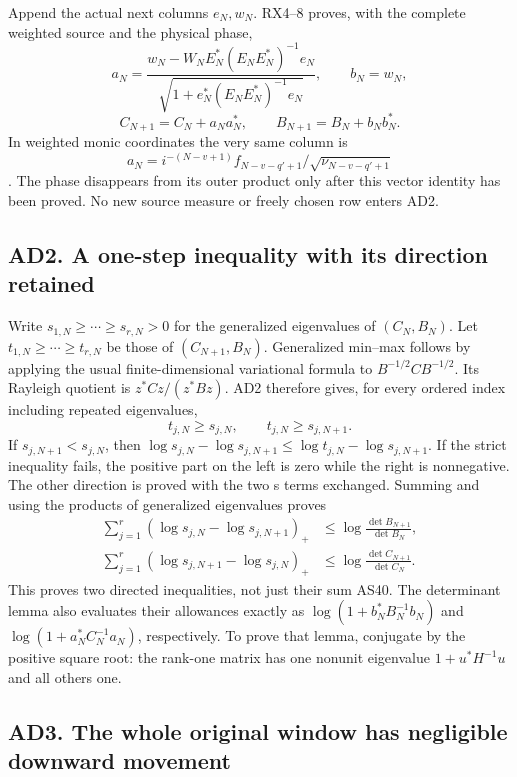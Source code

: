 \documentclass[11pt]{article}
\begin{document}
Append the actual next columns \(e_N,w_N\). RX4--8 proves, with the complete weighted source and the physical phase, \[
a_N=\frac{w_N-W_NE_N^*(E_NE_N^*)^{-1}e_N}
{\sqrt{1+e_N^*(E_NE_N^*)^{-1}e_N}},
\qquad b_N=w_N,
\] \[
C_{N+1}=C_N+a_Na_N^*,\qquad
B_{N+1}=B_N+b_Nb_N^*.
\tag{AD2}
\] In weighted monic coordinates the very same column is \[a_N=i^{-(N-v+1)}f_{N-v-q'+1}/\sqrt{\nu_{N-v-q'+1}}\]. The phase disappears from its outer product only after this vector identity has been proved. No new source measure or freely chosen row enters AD2.

\subsection{AD2. A one-step inequality with its direction retained}\label{ad2.-a-one-step-inequality-with-its-direction-retained}

Write \(s_{1,N}\ge\cdots\ge s_{r,N}>0\) for the generalized eigenvalues of \((C_N,B_N)\). Let \(t_{1,N}\ge\cdots\ge t_{r,N}\) be those of \((C_{N+1},B_N)\). Generalized min--max follows by applying the usual finite-dimensional variational formula to \(B^{-1/2}CB^{-1/2}\). Its Rayleigh quotient is \(z^*Cz/(z^*Bz)\). AD2 therefore gives, for every ordered index including repeated eigenvalues, \[
t_{j,N}\ge s_{j,N},\qquad t_{j,N}\ge s_{j,N+1}.
\tag{AD3}
\] If \(s_{j,N+1}<s_{j,N}\), then \(\log s_{j,N}-\log s_{j,N+1}\le\log t_{j,N}-\log s_{j,N+1}\). If the strict inequality fails, the positive part on the left is zero while the right is nonnegative. The other direction is proved with the two s terms exchanged. Summing and using the products of generalized eigenvalues proves \[
\begin{aligned}
\sum_{j=1}^r(\log s_{j,N}-\log s_{j,N+1})_+
&\le\log\frac{\det B_{N+1}}{\det B_N},\\
\sum_{j=1}^r(\log s_{j,N+1}-\log s_{j,N})_+
&\le\log\frac{\det C_{N+1}}{\det C_N}.
\end{aligned}
\tag{AD4}
\] This proves two directed inequalities, not just their sum AS40. The determinant lemma also evaluates their allowances exactly as \(\log(1+b_N^*B_N^{-1}b_N)\) and \(\log(1+a_N^*C_N^{-1}a_N)\), respectively. To prove that lemma, conjugate by the positive square root: the rank-one matrix has one nonunit eigenvalue \(1+u^*H^{-1}u\) and all others one.

\subsection{AD3. The whole original window has negligible downward movement}\label{ad3.-the-whole-original-window-has-negligible-downward-movement}
\end{document}
